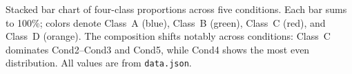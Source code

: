 \caption{Stacked bar chart of four-class proportions across five conditions. Each bar sums to 100\%; colors denote Class~A (blue), Class~B (green), Class~C (red), and Class~D (orange). The composition shifts notably across conditions: Class~C dominates Cond2--Cond3 and Cond5, while Cond4 shows the most even distribution. All values are from \texttt{data.json}.}
